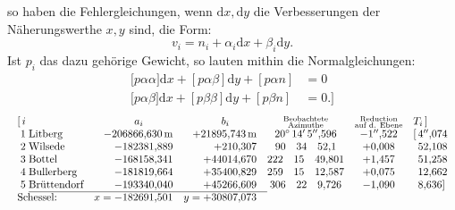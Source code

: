 \noindent so haben die Fehlergleichungen, wenn \(\mathrm{d}x,\mathrm{d}y\) die Verbesserungen der Näherungswerthe \(x,y\) sind, die Form:
\[
 v_i=n_i+\alpha_i\mathrm{d}x+\beta_i\mathrm{d}y.
\]
Ist \(p_i\) das dazu gehörige Gewicht, so lauten mithin die Normalgleichungen:
\[
\begin{aligned}
 {[}p\alpha\alpha]\mathrm{d}x+[p\alpha\beta]\mathrm{d}y+[p\alpha n]&=0\\
 {[}p\alpha\beta]\mathrm{d}x+[p\beta\beta]\mathrm{d}y+[p\beta n]&=0.]
\end{aligned}
\]
\[
\resizebox{\linewidth}{!}{\(\begin{array}{@{}r@{\;}l@{\quad}r@{\quad}r@{\quad}c@{\quad}c@{\quad}l@{}}
 [\,i&&\multicolumn{1}{c}{a_i}&\multicolumn{1}{c}{b_i}&
 \substack{\text{Beobachtete}\\\text{Azimuthe}}&
 \substack{\text{Reduction}\\\text{auf d. Ebene}}&T_i\,]\\
 1&\text{Litberg}&-206866{,}630\,\mathrm{m}&+21895{,}743\,\mathrm{m}
 &20^\circ\,14'\,5''{,}596&-1''{,}522&[\,4''{,}074\\
 2&\text{Wilsede}&-182381{,}889&+210{,}307&90\quad34\quad52{,}1&+0{,}008&\phantom{[\,}52{,}108\\
 3&\text{Bottel}&-168158{,}341&+44014{,}670&222\quad15\quad49{,}801&+1{,}457&\phantom{[\,}51{,}258\\
 4&\text{Bullerberg}&-181819{,}664&+35400{,}829&259\quad15\quad12{,}587&+0{,}075&\phantom{[\,}12{,}662\\
 5&\text{Brüttendorf}&-193340{,}040&+45266{,}609&306\quad22\quad9{,}726&-1{,}090&\phantom{[\,}8{,}636]\\
 \cline{2-4}
 \multicolumn{2}{@{}l}{\text{Schessel:}}&x=-182691{,}501&y=+30807{,}073&&&
\end{array}\)}
\]
